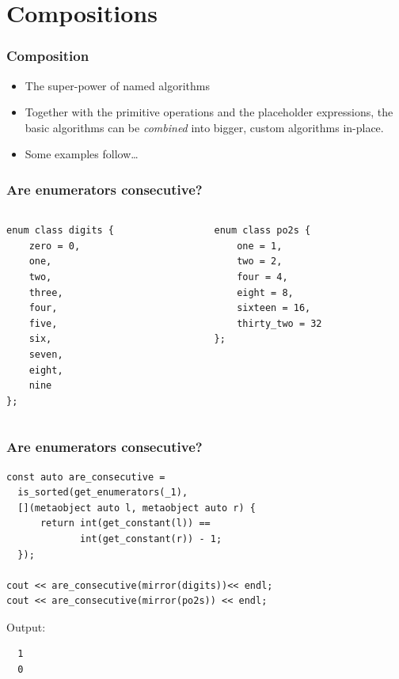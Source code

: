 \documentclass[compress,table,xcolor=table]{beamer}
\begin{document}
\section{Compositions}
\begin{frame}
  \frametitle{Composition}
  \larger
  \begin{itemize}
    \item {\larger The super-power of named algorithms}
    \item Together with the primitive operations and the placeholder expressions,
      the basic algorithms can be {\em \larger combined} into bigger,
      custom algorithms in-place.
    \item Some examples follow\ldots
  \end{itemize}
\end{frame}
\begin{frame}[fragile]
  \frametitle{Are enumerators consecutive?}
  \begin{columns}
    \begin{column}{.43\textwidth}
      \begin{lstlisting}[language=c++2x,basicstyle=\small\ttfamily]
enum class digits {
    zero = 0,
    one,
    two,
    three,
    four,
    five,
    six,
    seven,
    eight,
    nine
};
      \end{lstlisting}
    \end{column}
    \begin{column}{.47\textwidth}
      \begin{lstlisting}[language=c++2x,basicstyle=\small\ttfamily]
enum class po2s {
    one = 1,
    two = 2,
    four = 4,
    eight = 8,
    sixteen = 16,
    thirty_two = 32
};
      \end{lstlisting}
    \end{column}
  \end{columns}
\end{frame}
\begin{frame}[fragile]
  \frametitle{Are enumerators consecutive?}
  \begin{lstlisting}[language=c++2x,basicstyle=\small\ttfamily]
const auto are_consecutive =
  is_sorted(get_enumerators(_1),
  [](metaobject auto l, metaobject auto r) {
      return int(get_constant(l)) ==
             int(get_constant(r)) - 1;
  });

cout << are_consecutive(mirror(digits))<< endl;
cout << are_consecutive(mirror(po2s)) << endl;
  \end{lstlisting}
  Output:
  \begin{verbatim}
  1
  0
  \end{verbatim}
\end{frame}
\end{document}
